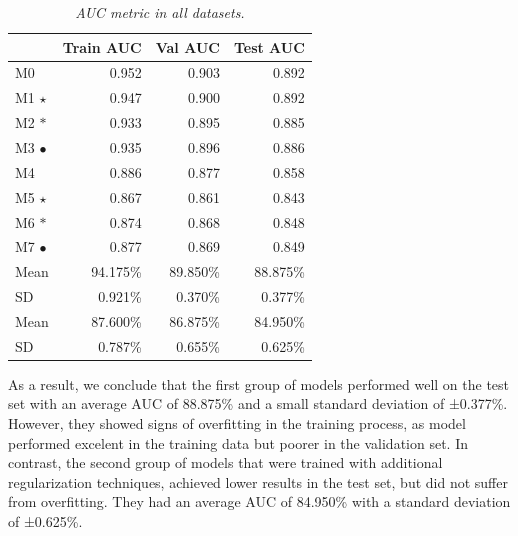   \begin{table}
    \centering
    \begin{tabular}{lrrr}
      \toprule
      & \textbf{Train AUC} & \textbf{Val AUC} & \textbf{Test AUC} \\
      \midrule
      M0 & 0.952 & 0.903 & 0.892  \\
      M1 $\star$ & 0.947 & 0.900 & 0.892 \\
      M2 $\ast$ & 0.933 & 0.895 & 0.885 \\
      M3 $\bullet$ & 0.935 & 0.896 & 0.886 \\
      \midrule
      \cellcolor{gray!50}M4 & \cellcolor{gray!50}0.886 & \cellcolor{gray!50}0.877 & \cellcolor{gray!50}0.858 \\
      \cellcolor{gray!50}M5 $\star$ & \cellcolor{gray!50}0.867 & \cellcolor{gray!50}0.861 & \cellcolor{gray!50}0.843 \\
      \cellcolor{gray!50}M6 $\ast$ & \cellcolor{gray!50}0.874 & \cellcolor{gray!50}0.868 & \cellcolor{gray!50}0.848 \\
      \cellcolor{gray!50}M7 $\bullet$ & \cellcolor{gray!50}0.877 & \cellcolor{gray!50}0.869 & \cellcolor{gray!50}0.849 \\

      \midrule

      Mean &  94.175\% & 89.850\% & 88.875\%  \\
      SD   & 0.921\% & 0.370\% & 0.377\%  \\

      \midrule

      \cellcolor{gray!50}Mean & \cellcolor{gray!50}87.600\% & \cellcolor{gray!50}86.875\% & \cellcolor{gray!50}84.950\% \\
      \cellcolor{gray!50}SD & \cellcolor{gray!50}0.787\% & \cellcolor{gray!50}0.655\% & \cellcolor{gray!50}0.625\% \\

      \bottomrule
    \end{tabular}
    \caption[Metrics in the datasets]
    {\textit{AUC metric in all datasets. }}
    {\label{table:resume-metrics}}
  \end{table}

As a result, we conclude that the first group of models performed well on the
test set with an average AUC of 88.875\% and a small standard deviation of
±0.377\%. However, they showed signs of overfitting in the training process, as
model performed excelent in the training data but poorer in the validation set.
In contrast, the second group of models that were trained with additional
regularization techniques, achieved lower results in the test set, but did not
suffer from overfitting. They had an average AUC of 84.950\% with a standard
deviation of ±0.625\%.

